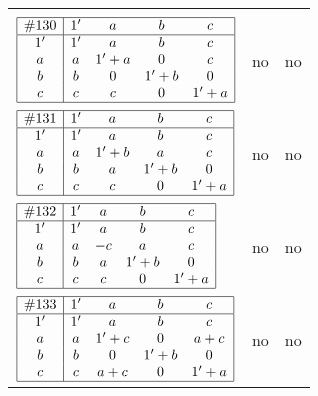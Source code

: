 \documentclass[12pt]{article}
\theoremstyle{definition}
\newcommand{\join}{\mathbin{+}}%
\newcommand{\id}{{1'}}%
\begin{document}
\begin{center}
\begin{longtable}{l|c|c}
{\begin{tikzpicture}[<->,shorten <=1pt,shorten >=1pt,label distance=0mm, font=\small]
\end{tikzpicture}
}      \\[15mm]

$
\begin{array}{|c|cccc|} \hline
\#130 & \id & a & b & c \\ \hline
\id & \id & a & b & c \\
a & a & \id \join a & 0 & c \\
b & b & 0 & \id \join b & 0 \\
c & c & c & 0 & \id \join a \\ \hline
\end{array}
$
 & no  
 & no     \\[15mm]

$
\begin{array}{|c|cccc|} \hline
\#131 & \id & a & b & c \\ \hline
\id & \id & a & b & c \\
a & a & \id \join b & a & c \\
b & b & a & \id \join b & 0 \\
c & c & c & 0 & \id \join a \\ \hline
\end{array}
$
 & no  
 & no      \\[15mm]

$
\begin{array}{|c|cccc|} \hline
\#132 & \id & a & b & c \\ \hline
\id & \id & a & b & c \\
a & a & -c & a & c \\
b & b & a & \id \join b & 0 \\
c & c & c & 0 & \id \join a \\ \hline
\end{array}
$
 & no  
 & no      \\[15mm]

$
\begin{array}{|c|cccc|} \hline
\#133 & \id & a & b & c \\ \hline
\id & \id & a & b & c \\
a & a & \id \join c & 0 & a \join c \\
b & b & 0 & \id \join b & 0 \\
c & c & a \join c & 0 & \id \join a \\ \hline
\end{array}
$
 & no  
 & no      \\[15mm]


\end{longtable}
\end{center}
\end{document}
